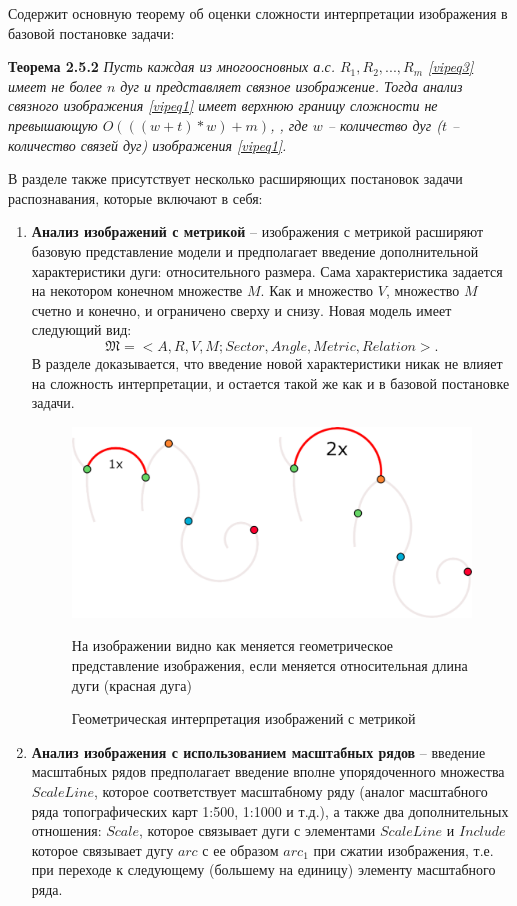 Содержит основную теорему об оценки сложности интерпретации изображения в базовой постановке задачи:

\medskip
\textbf{Теорема 2.5.2} \textit{Пусть каждая из многоосновных а.с. $R_1, R_2, ..., R_m$  \ref{vipeq3} имеет не  более   $n$   дуг и представляет связное изображение. Тогда анализ  связного изображения \ref{vipeq1} имеет верхнюю границу сложности не превышающую $O(((w + t)*w) + m)$,  , где  $w$ -- количество дуг ($t$ -- количество связей дуг) изображения \ref{vipeq1}.}
\medskip

В разделе также присутствует несколько расширяющих постановок задачи распознавания, которые включают в себя:

\begin{enumerate}
\item \textbf{Анализ изображений с метрикой} -- изображения с метрикой расширяют базовую представление модели и предполагает введение дополнительной характеристики дуги: относительного размера. Сама характеристика задается на некотором конечном множестве $M$. Как и множество $V$, множество $M$ счетно и конечно, и ограничено сверху и снизу. Новая модель имеет следующий вид: $$\mathfrak{M}=<A, R, V, M; Sector, Angle, Metric, Relation>.$$ В разделе доказывается, что введение новой характеристики никак не влияет на сложность интерпретации, и остается такой же как и в базовой постановке задачи. 

\begin{figure}[h]
\centering
\includegraphics[width=0.85\linewidth,keepaspectratio]{images/metrics}
\caption{Геометрическая интерпретация изображений с метрикой}
\medskip
\small
На изображении видно как меняется геометрическое представление изображения, если меняется относительная длина дуги (красная дуга)
\end{figure}

\item \textbf{Анализ изображения с использованием масштабных рядов} -- введение масштабных рядов предполагает введение вполне упорядоченного множества $ScaleLine$, которое соответствует масштабному ряду (аналог масштабного ряда топографических карт 1:500,  1:1000 и т.д.), а также два дополнительных отношения: $Scale$,  которое связывает дуги с элементами $ScaleLine$ и $Include$ которое связывает дугу $arc$ с ее образом $arc_1$ при сжатии изображения, т.е. при переходе к следующему (большему на единицу) элементу масштабного ряда.


\end{enumerate}

